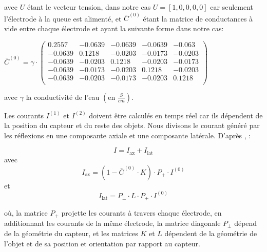 avec $U$ étant le vecteur tension, dans notre cas $U = \left [1, 0, 0, 0, 0 \right ]$ car seulement l'électrode à la queue est alimenté, et $\bar{C}^{(0)}$ étant la matrice de conductances à vide entre chaque électrode et ayant la suivante forme dans notre cas: 
\begin{center}
$\bar{C}^{(0)} = \gamma \cdot 
\begin{pmatrix}
0.2557 & -0.0639 & -0.0639 & -0.0639 & -0.063 \\
-0.0639 & 0.1218 & -0.0203 & -0.0173 & -0.0203 \\
-0.0639 & -0.0203 & 0.1218 & -0.0203 & -0.0173 \\
-0.0639 & -0.0173 & -0.0203 & 0.1218 & -0.0203 \\
-0.0639 & -0.0203 & -0.0173 & -0.0203 & 0.1218 \\
\end{pmatrix}$
\end{center}

avec $\gamma$ la conductivité de l'eau $\left ( \text{en } \frac{S}{cm} \right )$.

Les courants $I^{(1)}$ et $I^{(2)}$ doivent être calculés en temps réel car ils dépendent de la position du capteur et du reste des objets. Nous divisons le courant généré par les réflexions en une composante axiale et une composante latérale. D'après \cite{Boyer2012}, : 

\begin{equation}
    I = I_{\text{ax}} + I_{\text{lat}}
\end{equation}
avec
\begin{equation}
    I_{\text{ax}} = \left ( 1- \bar{C}^{(0)} \cdot K \right ) \cdot P_{+} \cdot I^{(0)}
\end{equation}
et 
\begin{equation}
    I_{\text{lat}} = P_{\perp} \cdot L \cdot P_{+} \cdot I^{(0)}
\end{equation}

où, la matrice $P_{+}$ projette les courants à travers chaque électrode, en additionnant les courants de la même électrode, la matrice diagonale $P_{\perp}$ dépend de la géométrie du capteur, et les matrices $K$ et $L$ dépendent de la géométrie de l'objet et de sa position et orientation par rapport au capteur. 

